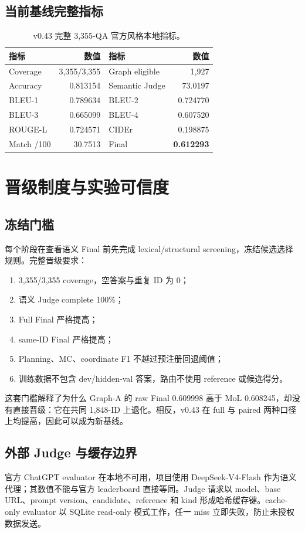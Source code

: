 \documentclass[UTF8,a4paper,11pt]{ctexart}
\begin{document}
\subsection{当前基线完整指标}
\begin{table}[H]
\centering
\caption{v0.43 完整 3,355-QA 官方风格本地指标。}
\begin{tabular}{lr@{\qquad}lr}
\toprule
指标 & 数值 & 指标 & 数值\\
\midrule
Coverage & 3,355/3,355 & Graph eligible & 1,927\\
Accuracy & 0.813154 & Semantic Judge & 73.0197\\
BLEU-1 & 0.789634 & BLEU-2 & 0.724770\\
BLEU-3 & 0.665099 & BLEU-4 & 0.607520\\
ROUGE-L & 0.724571 & CIDEr & 0.198875\\
Match /100 & 30.7513 & Final & \textbf{0.612293}\\
\bottomrule
\end{tabular}
\end{table}

\section{晋级制度与实验可信度}
\subsection{冻结门槛}
每个阶段在查看语义 Final 前先完成 lexical/structural screening，冻结候选选择规则。完整晋级要求：
\begin{enumerate}
  \item 3,355/3,355 coverage，空答案与重复 ID 为 0；
  \item 语义 Judge complete 100\%；
  \item Full Final 严格提高；
  \item same-ID Final 严格提高；
  \item Planning、MC、coordinate F1 不越过预注册回退阈值；
  \item 训练数据不包含 dev/hidden-val 答案，路由不使用 reference 或候选得分。
\end{enumerate}
这套门槛解释了为什么 Graph-A 的 raw Final 0.609998 高于 MoL 0.608245，却没有直接晋级：它在共同 1,848-ID 上退化。相反，v0.43 在 full 与 paired 两种口径上均提高，因此可以成为新基线。

\subsection{外部 Judge 与缓存边界}
官方 ChatGPT evaluator 在本地不可用，项目使用 DeepSeek-V4-Flash 作为语义代理；其数值不能与官方 leaderboard 直接等同。Judge 请求以 model、base URL、prompt version、candidate、reference 和 kind 形成哈希缓存键。cache-only evaluator 以 SQLite read-only 模式工作，任一 miss 立即失败，防止未授权数据发送。
\end{document}
